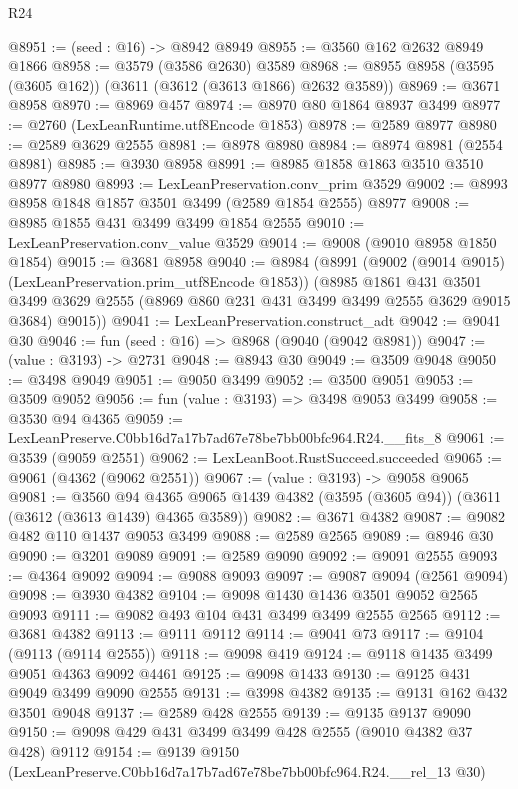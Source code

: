 \begin{lexlean}{R24}
\begin{coremodule}
@8951 := (seed : @16) -> @8942 @8949
@8955 := @3560 @162 @2632 @8949 @1866
@8958 := @3579 (@3586 @2630) @3589
@8968 := @8955 @8958 (@3595 (@3605 @162)) (@3611 (@3612 (@3613 @1866) @2632 @3589))
@8969 := @3671 @8958
@8970 := @8969 @457
@8974 := @8970 @80 @1864 @8937 @3499
@8977 := @2760 (LexLeanRuntime.utf8Encode @1853)
@8978 := @2589 @8977
@8980 := @2589 @3629 @2555
@8981 := @8978 @8980
@8984 := @8974 @8981 (@2554 @8981)
@8985 := @3930 @8958
@8991 := @8985 @1858 @1863 @3510 @3510 @8977 @8980
@8993 := LexLeanPreservation.conv_prim @3529
@9002 := @8993 @8958 @1848 @1857 @3501 @3499 (@2589 @1854 @2555) @8977
@9008 := @8985 @1855 @431 @3499 @3499 @1854 @2555
@9010 := LexLeanPreservation.conv_value @3529
@9014 := @9008 (@9010 @8958 @1850 @1854)
@9015 := @3681 @8958
@9040 := @8984
    (@8991
      (@9002 (@9014 @9015) (LexLeanPreservation.prim_utf8Encode @1853))
      (@8985
        @1861
        @431
        @3501
        @3499
        @3629
        @2555
        (@8969 @860 @231 @431 @3499 @3499 @2555 @3629 @9015 @3684)
        @9015))
@9041 := LexLeanPreservation.construct_adt
@9042 := @9041 @30
@9046 := fun (seed : @16) => @8968 (@9040 (@9042 @8981))
@9047 := (value : @3193) -> @2731
@9048 := @8943 @30
@9049 := @3509 @9048
@9050 := @3498 @9049
@9051 := @9050 @3499
@9052 := @3500 @9051
@9053 := @3509 @9052
@9056 := fun (value : @3193) => @3498 @9053 @3499
@9058 := @3530 @94 @4365
@9059 := LexLeanPreserve.C0bb16d7a17b7ad67e78be7bb00bfc964.R24.__fits_8
@9061 := @3539 (@9059 @2551)
@9062 := LexLeanBoot.RustSucceed.succeeded
@9065 := @9061 (@4362 (@9062 @2551))
@9067 := (value : @3193) -> @9058 @9065
@9081 := @3560
    @94
    @4365
    @9065
    @1439
    @4382
    (@3595 (@3605 @94))
    (@3611 (@3612 (@3613 @1439) @4365 @3589))
@9082 := @3671 @4382
@9087 := @9082 @482 @110 @1437 @9053 @3499
@9088 := @2589 @2565
@9089 := @8946 @30
@9090 := @3201 @9089
@9091 := @2589 @9090
@9092 := @9091 @2555
@9093 := @4364 @9092
@9094 := @9088 @9093
@9097 := @9087 @9094 (@2561 @9094)
@9098 := @3930 @4382
@9104 := @9098 @1430 @1436 @3501 @9052 @2565 @9093
@9111 := @9082 @493 @104 @431 @3499 @3499 @2555 @2565
@9112 := @3681 @4382
@9113 := @9111 @9112
@9114 := @9041 @73
@9117 := @9104 (@9113 (@9114 @2555))
@9118 := @9098 @419
@9124 := @9118 @1435 @3499 @9051 @4363 @9092 @4461
@9125 := @9098 @1433
@9130 := @9125 @431 @9049 @3499 @9090 @2555
@9131 := @3998 @4382
@9135 := @9131 @162 @432 @3501 @9048
@9137 := @2589 @428 @2555
@9139 := @9135 @9137 @9090
@9150 := @9098 @429 @431 @3499 @3499 @428 @2555 (@9010 @4382 @37 @428) @9112
@9154 := @9139 @9150 (LexLeanPreserve.C0bb16d7a17b7ad67e78be7bb00bfc964.R24.__rel_13 @30)

\end{coremodule}
\end{lexlean}
